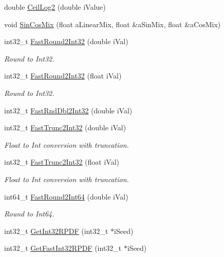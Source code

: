 \begin{DoxyCompactItemize}
\item 
double \mbox{\hyperlink{a00852_aad5df8c4502619ca12136a2f7b8d8a06}{Ceil\+Log2}} (double i\+Value)
\item 
void \mbox{\hyperlink{a00852_a3826233eb62186c03bb093f1031ca8f4}{Sin\+Cos\+Mix}} (float a\+Linear\+Mix, float \&a\+Sin\+Mix, float \&a\+Cos\+Mix)
\item 
int32\+\_\+t \mbox{\hyperlink{a00852_af0bbeabd87aa74be4ecca4f767aedc41}{Fast\+Round2\+Int32}} (double i\+Val)
\begin{DoxyCompactList}\small\item\em Round to Int32. \end{DoxyCompactList}\item 
int32\+\_\+t \mbox{\hyperlink{a00852_a56cd923aeae2bd544f1fb43fff6b0b3d}{Fast\+Round2\+Int32}} (float i\+Val)
\begin{DoxyCompactList}\small\item\em Round to Int32. \end{DoxyCompactList}\item 
int32\+\_\+t \mbox{\hyperlink{a00852_ae690c060a5ff4cb96e77335231a29673}{Fast\+Rnd\+Dbl2\+Int32}} (double i\+Val)
\item 
int32\+\_\+t \mbox{\hyperlink{a00852_ad2b2872b49146cf0859c403fea702a39}{Fast\+Trunc2\+Int32}} (double i\+Val)
\begin{DoxyCompactList}\small\item\em Float to Int conversion with truncation. \end{DoxyCompactList}\item 
int32\+\_\+t \mbox{\hyperlink{a00852_a9a8bc8a47f13b4cb1bb84e45bf43fe82}{Fast\+Trunc2\+Int32}} (float i\+Val)
\begin{DoxyCompactList}\small\item\em Float to Int conversion with truncation. \end{DoxyCompactList}\item 
int64\+\_\+t \mbox{\hyperlink{a00852_a7df6b095ea2469f2adce2a895038212e}{Fast\+Round2\+Int64}} (double i\+Val)
\begin{DoxyCompactList}\small\item\em Round to Int64. \end{DoxyCompactList}\item 
int32\+\_\+t \mbox{\hyperlink{a00852_af3435129d3c94c5f3d5e671943b9bbe2}{Get\+Int32\+R\+P\+DF}} (int32\+\_\+t $\ast$i\+Seed)
\item 
int32\+\_\+t \mbox{\hyperlink{a00852_ad12251899137d551b9f652b1ffee2f99}{Get\+Fast\+Int32\+R\+P\+DF}} (int32\+\_\+t $\ast$i\+Seed)

\end{DoxyCompactItemize}
